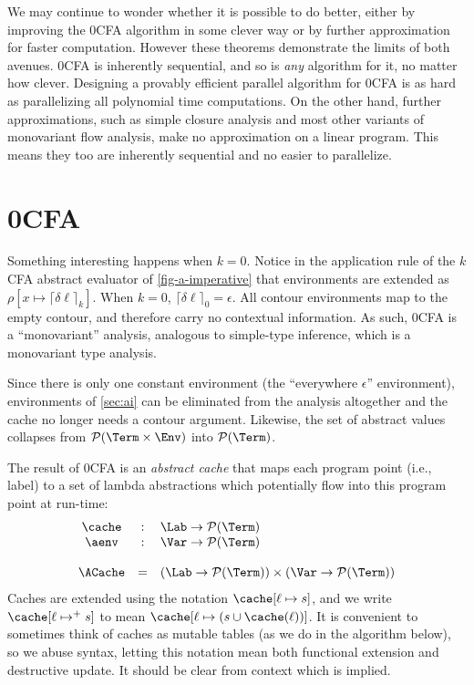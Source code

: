 We may continue to wonder whether it is possible to do better, either
by improving the 0CFA algorithm in some clever way or by further
approximation for faster computation.  However these theorems
demonstrate the limits of both avenues.  0CFA is inherently
sequential, and so is {\em any} algorithm for it, no matter how
clever.  Designing a provably efficient parallel algorithm for 0CFA is
as hard as parallelizing all polynomial time computations.  On the
other hand, further approximations, such as simple closure analysis
and most other variants of monovariant flow analysis, make no
approximation on a linear program.  This means they too are inherently
sequential and no easier to parallelize.


\section{0CFA}
\label{sec:0cfa}

Something interesting happens when $k=0$.  Notice in the application
rule of the $k$CFA abstract evaluator of \autoref{fig-a-imperative}
that environments are extended as $\rho[x\mapsto
\lceil\delta\ell\rceil_k]$.  When $k=0$,
$\lceil\delta\ell\rceil_0=\epsilon$.  All contour environments map to
the empty contour, and therefore carry no contextual information.  As
such, 0CFA is a ``monovariant'' analysis, analogous to simple-type
inference, which is a monovariant type analysis.

Since there is only one constant environment (the ``everywhere
$\epsilon$'' environment), environments of \autoref{sec:ai} can be
eliminated from the analysis altogether and the cache no longer needs
a contour argument.  Likewise, the set of abstract values collapses
from $\mathcal{P}(\Term\times\Env)$ into $\mathcal{P}(\Term)$.

The result of 0CFA is an {\em abstract cache} that maps each program
point (i.e., label) to a set of lambda abstractions which potentially
flow into this program point at run-time:
\begin{displaymath}
\begin{array}{ccl}
\cache & : & \Lab \rightarrow \mathcal{P}(\Term) \\
\aenv & : & \Var \rightarrow \mathcal{P}(\Term)\\
\\
\ACache & = & (\Lab \rightarrow \mathcal{P}(\Term)) \times
              (\Var \rightarrow \mathcal{P}(\Term))  
\end{array}
\end{displaymath}
Caches are extended using the notation $\cache[\ell \mapsto s]$, and
we write $\cache[\ell \mapsto^+ s]$ to mean $\cache[\ell \mapsto
(s\cup \cache(\ell))]$.  It is convenient to sometimes think of caches
as mutable tables (as we do in the algorithm below), so we abuse
syntax, letting this notation mean both functional extension and
destructive update.  It should be clear from context which is implied.

